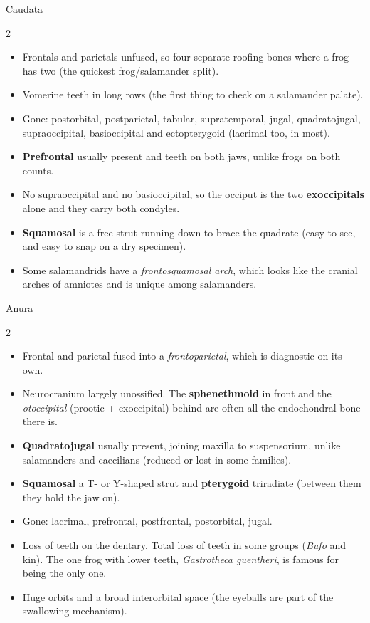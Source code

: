 \documentclass[11pt]{article}
\newcommand{\bone}[1]{\textbf{#1}}
\newcommand{\term}[1]{\textsl{#1}}
\begin{document}
\begin{cladebox}{Caudata}
\begin{multicols}{2}
\begin{itemize}
\item Frontals and parietals unfused, so four separate roofing bones where a frog
  has two (the quickest frog/salamander split).
\item Vomerine teeth in long rows (the first thing to check on a salamander palate).
\item Gone: postorbital, postparietal, tabular, supratemporal, jugal, quadratojugal,
  supraoccipital, basioccipital and ectopterygoid (lacrimal too, in most).
\item \bone{Prefrontal} usually present and teeth on both jaws, unlike frogs on
  both counts.
\item No supraoccipital and no basioccipital, so the occiput is the two
  \bone{exoccipitals} alone and they carry both condyles.
\item \bone{Squamosal} is a free strut running down to brace the quadrate (easy to
  see, and easy to snap on a dry specimen).
\item Some salamandrids have a \term{frontosquamosal arch}, which looks like the
  cranial arches of amniotes and is unique among salamanders.
\end{itemize}
\end{multicols}
\end{cladebox}

\begin{cladebox}{Anura}
\begin{multicols}{2}
\begin{itemize}
\item Frontal and parietal fused into a \term{frontoparietal}, which is diagnostic
  on its own.
\item Neurocranium largely unossified. The \bone{sphenethmoid} in front and the
  \term{otoccipital} (prootic + exoccipital) behind are often all the
  endochondral bone there is.
\item \bone{Quadratojugal} usually present, joining maxilla to suspensorium, unlike
  salamanders and caecilians (reduced or lost in some families).
\item \bone{Squamosal} a T- or Y-shaped strut and \bone{pterygoid} triradiate
  (between them they hold the jaw on).
\item Gone: lacrimal, prefrontal, postfrontal, postorbital, jugal.
\item Loss of teeth on the dentary. Total loss of teeth in some groups
  (\emph{Bufo} and kin). The one frog with lower teeth, \emph{Gastrotheca
  guentheri}, is famous for being the only one.
\item Huge orbits and a broad interorbital space (the eyeballs are part of the
  swallowing mechanism).
\end{itemize}
\end{multicols}
\end{cladebox}
\end{document}
